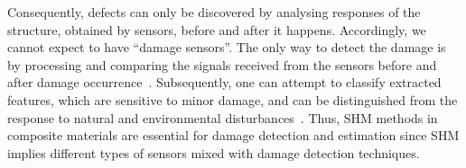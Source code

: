 Consequently, defects can only be discovered by analysing responses of the structure, obtained by sensors, before and after it happens.
Accordingly, we cannot expect to have “damage sensors”.
The only way to detect the damage is by processing and comparing the signals received from the sensors before and after damage occurrence~\cite{s18041094}. 
Subsequen\-tly, one can attempt to classify extracted features, which are sensitive to minor damage, and can be distinguished from the response to natural and environmental disturbances~\cite{s18041094}. 
Thus, SHM  methods in composite materials are essential for damage detection and estimation since SHM implies different types of sensors mixed with damage detection techniques. 